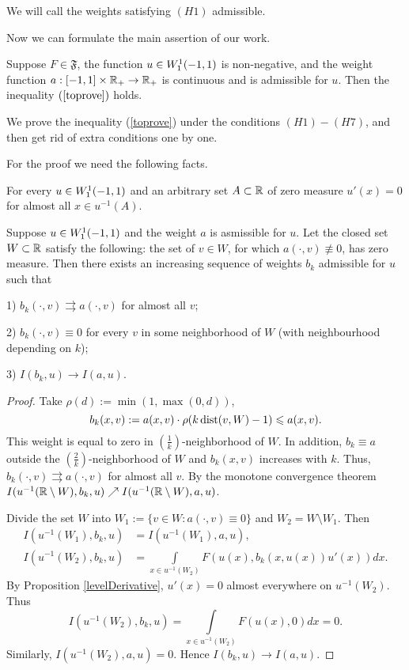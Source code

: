 \bigskip

We will call the weights satisfying $(H1)$ admissible.

Now we can formulate the main assertion of our work.
\begin{thm}
\label{mainThm}
Suppose $F \in \mathfrak{F}$, the function $u \in W_1^1(-1, 1)$ is non-negative,
and the weight function $a: [-1, 1] \times \mathbb R_+ \to \mathbb R_+$ is continuous
and is admissible for $u$.
Then the inequality $(\ref{toprove})$ holds.
\end{thm}

We prove the inequality (\ref{toprove}) under the conditions $(H1)-(H7)$,
and then get rid of extra conditions one by one.

For the proof we need the following facts.

\begin{prop}
\label{levelDerivative}
{\rm \cite[Theorem 6.19]{LL} }
For every $u \in W_1^1(-1, 1)$ and an arbitrary set $A \subset \mathbb R$ of zero measure
$u'(x) = 0$ for almost all $x \in u^{-1}(A)$.
\end{prop}

\begin{lm}
\label{zeroApprox}
Suppose $u \in W_1^1(-1, 1)$ and the weight $a$ is asmissible for $u$.
Let the closed set $W \subset \mathbb R$ satisfy the following:
the set of $v \in W$, for which $a(\cdot, v) \not\equiv 0$, has zero measure.
Then there exists an increasing sequence of weights $b_k$ admissible for $u$ such that

1) $b_k(\cdot, v) \rightrightarrows a(\cdot, v)$ for almost all $v$;

2) $b_k(\cdot, v) \equiv 0$ for every $v$ in some neighborhood of $W$ (with neighbourhood depending on $k$);

3) $I(b_k, u) \to I(a, u)$.
\end{lm}

\begin{proof}
Take $\rho(d) := \min(1, \max(0, d))$,
$$b_k(x, v) := a(x, v) \cdot \rho(k \mathop{\rm dist}\nolimits(v, W) - 1) \leqslant a(x, v).$$
This weight is equal to zero in $\left(\frac{1}{k}\right)$-neighborhood of $W$.
In addition, $b_k \equiv a$ outside the $\left(\frac{2}{k}\right)$-neighborhood of $W$ and
$b_k(x, v)$ increases with $k$.
Thus, $b_k(\cdot, v) \rightrightarrows a(\cdot, v)$ for almost all $v$.
By the monotone convergence theorem
$I(u^{-1}(\mathbb R \setminus W), b_k, u) \nearrow I(u^{-1}(\mathbb R \setminus W), a, u)$.

Divide the set $W$ into $W_1 := \{v \in W: a(\cdot, v) \equiv 0\}$ and $W_2 = W \setminus W_1$.
Then
$$
\begin{aligned}
I(u^{-1}(W_1), b_k, u) &= I(u^{-1}(W_1), a, u),\\
I(u^{-1}(W_2), b_k, u) &= \int\limits_{x \in u^{-1}(W_2)} F(u(x), b_k(x, u(x)) u'(x)) dx.
\end{aligned}
$$
By Proposition \ref{levelDerivative}, $u'(x) = 0$ almost everywhere on $u^{-1}(W_2)$.
Thus
$$I(u^{-1}(W_2), b_k, u) = \int\limits_{x \in u^{-1}(W_2)} F(u(x), 0) dx = 0.$$
Similarly, $I(u^{-1}(W_2), a, u) = 0$. Hence $I(b_k, u) \to I(a, u)$.
\end{proof}

